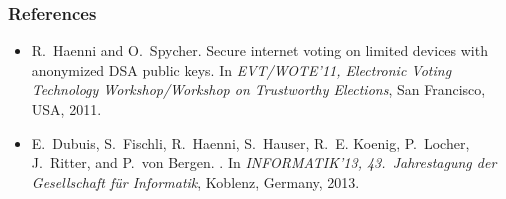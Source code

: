 \documentclass[bibtotoc,halfparskip,oneside]{scrreprt}
\begin{document}
\subsubsection{References}
\begin{itemize}
\item R.~Haenni and O.~Spycher.
\newblock Secure internet voting on limited devices with anonymized {DSA}
  public keys.
\newblock In {\em {EVT/WOTE'11}, Electronic Voting Technology Workshop/Workshop
  on Trustworthy Elections}, San Francisco, USA, 2011.
\item E.~Dubuis, S.~Fischli, R.~Haenni, S.~Hauser, R.~E. Koenig, P.~Locher,
  J.~Ritter, and P.~{von Bergen}.
.
\newblock In {\em {INFORMATIK'13}, 43.\ Jahrestagung der Gesellschaft f{\"u}r
  Informatik}, Koblenz, Germany, 2013.
\end{itemize}


% 
\end{document}
